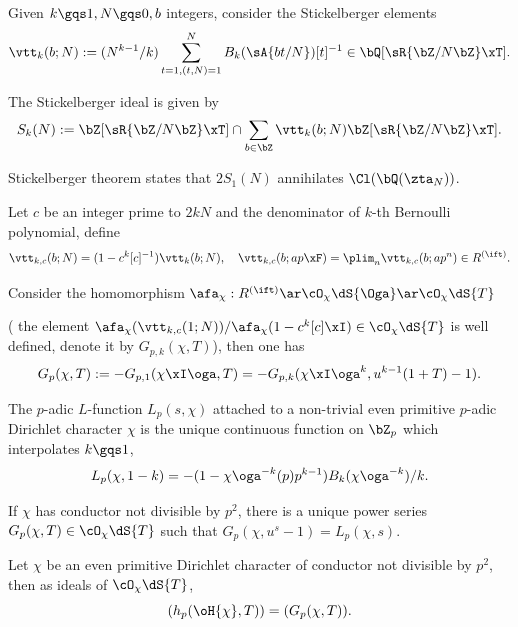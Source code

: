 \documentclass[a4paper, twoside]{article}
\begin{document}
\begin{cmt}
	\begin{dfn}
		Given $k\gqs1,N\gqs0,b$ integers, consider the Stickelberger elements
		\[
			\vtt_{k}(b;N):=(N^{k-1}/k)\sum_{t=1,(t,N)=1}^{N}B_{k}(\sA{bt/N})[t]^{-1}\in\bQ[\sR{\bZ/N\bZ}\xT].
		\]

		The Stickelberger ideal is given by
		\[
			S_{k}(N):=\bZ[\sR{\bZ/N\bZ}\xT]\cap\sum_{b\in\bZ}\vtt_{k}(b;N)\bZ[\sR{\bZ/N\bZ}\xT].
		\]

		Stickelberger theorem states that $2S_{1}(N)$ annihilates $\Cl(\bQ(\zta_{N}))$.

		Let $c$ be an integer prime to $2kN$ and the denominator of $k$-th Bernoulli polynomial, define
		\[
			\vtt_{k,c}(b; N)=(1-c^{k}[c]^{-1})\vtt_{k}(b;N),\quad \vtt_{k,c}(b;ap\xF)=\plim_{n}\vtt_{k,c}(b;ap^{n})\in R^{(\ift)}.
		\]

		Consider the homomorphism $\afa_{\chi}:R^{(\ift)}\ar\cO_{\chi}\dS{\Oga}\ar\cO_{\chi}\dS{T}$

			( the element $\afa_{\chi}(\vtt_{k,c}(1;N))/\afa_{\chi}(1-c^{k}[c]\xI)\in\cO_{\chi}\dS{T}$ is well defined, denote it by $G_{p,k}(\chi,T)$), then one has
			\[
				G_{p}(\chi,T):=-G_{p,1}(\chi\xI\oga,T)=-G_{p,k}(\chi\xI\oga^{k},u^{k-1}(1+T)-1).
			\]
	\end{dfn}

	\begin{dfn}
		The $p$-adic $L$-function $L_{p}(s,\chi)$ attached to a non-trivial even primitive $p$-adic Dirichlet character $\chi$ is the unique continuous function on $\bZ_{p}$ which interpolates $k\gqs1$,
		\[
			L_{p}(\chi,1-k)=-(1-\chi\oga^{-k}(p)p^{k-1})B_{k}(\chi\oga^{-k})/k.
		\]

		If $\chi$ has conductor not divisible by $p^{2}$, there is a unique power series $G_{p}(\chi,T)\in\cO_{\chi}\dS{T}$ such that $G_{p}(\chi,u^{s}-1)=L_{p}(\chi,s)$.
	\end{dfn}


	\begin{cnj}
		Let $\chi$ be an even primitive Dirichlet character of conductor not divisible by $p^{2}$, then as ideals of $\cO_{\chi}\dS{T}$,
		\[
			(h_{p}(\oH{\chi},T))=(G_{p}(\chi,T)).
		\]
	\end{cnj}
\end{cmt}
\end{document}
